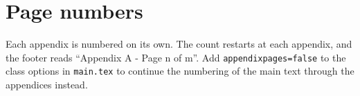 \section{Page numbers}
Each appendix is numbered on its own. The count restarts at each appendix, and the footer reads ``Appendix A - Page n of m''. Add \texttt{appendixpages=false} to the class options in \texttt{main.tex} to continue the numbering of the main text through the appendices instead.
